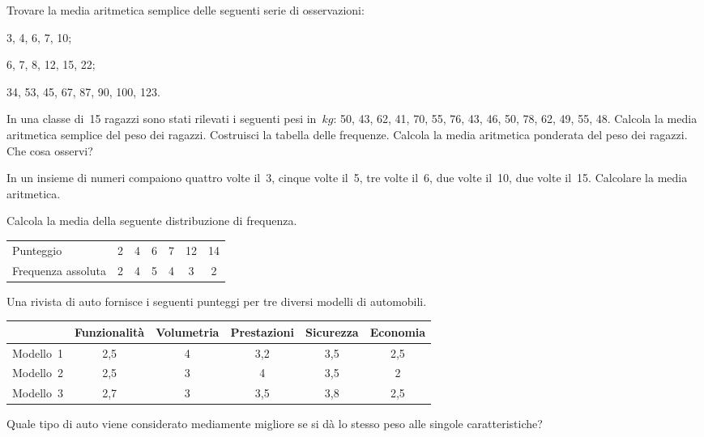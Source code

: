 \begin{esercizio}[\Ast]
\label{ese:A.24}
Trovare la media aritmetica semplice delle seguenti serie di osservazioni:
\begin{multicols}{2}
\begin{enumeratea}
 \item 3, 4, 6, 7, 10;
 \item 6, 7, 8, 12, 15, 22;
 \item 34, 53, 45, 67, 87, 90, 100, 123.
\end{enumeratea}
\end{multicols}
\end{esercizio}

\begin{esercizio}
\label{ese:A.25}
In una classe di~15 ragazzi sono stati rilevati i seguenti pesi in~$\unit{kg}$:
50, 43, 62, 41, 70, 55, 76, 43, 46, 50, 78, 62, 49, 55, 48.
Calcola la media aritmetica semplice del peso dei ragazzi. Costruisci la tabella delle frequenze.
Calcola la media aritmetica ponderata del peso dei ragazzi. Che cosa osservi?
\end{esercizio}

\begin{esercizio}[\Ast]
\label{ese:A.26}
In un insieme di numeri compaiono quattro volte il~3, cinque volte il~5, tre volte il~6, due volte il~10, due volte il~15. Calcolare la media aritmetica.
\end{esercizio}

\begin{esercizio}[\Ast]
\label{ese:A.27}
Calcola la media della seguente distribuzione di frequenza.
\begin{center}
 \begin{tabular}{l*{6}{c}}
\toprule
Punteggio & 2 & 4 & 6 & 7 & 12 & 14 \\
Frequenza assoluta & 2 & 4 & 5 & 4 & 3 & 2 \\
\bottomrule
\end{tabular}
\end{center}
\end{esercizio}

\begin{esercizio}
\label{ese:A.28}
Una rivista di auto fornisce i seguenti punteggi per tre diversi modelli di automobili.
\begin{center}
 \begin{tabular}{l*{5}{c}}
\toprule
 & Funzionalità & Volumetria & Prestazioni & Sicurezza & Economia \\
\midrule
Modello~1 & 2,5 & 4 & 3,2 & 3,5 & 2,5 \\
Modello~2 & 2,5 & 3 & 4 & 3,5 & 2 \\
Modello~3 & 2,7 & 3 & 3,5 & 3,8 & 2,5 \\
\bottomrule
\end{tabular}
\end{center}
Quale tipo di auto viene considerato mediamente migliore se si dà lo stesso peso alle singole caratteristiche?
\end{esercizio}

